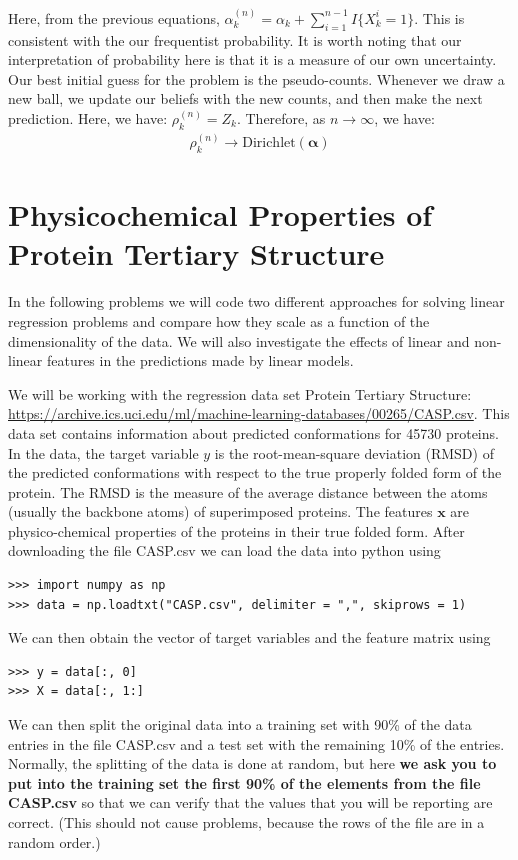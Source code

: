 \documentclass[submit]{harvardml}
\newcommand{\Dir}{\text{Dirichlet}}
\renewcommand{\v}{\boldsymbol}
\begin{document}
\begin{enumerate}[label=(\alph*)]
Here, from the previous equations, $\alpha^{(n)}_k = \alpha_k + \sum_{i=1}^{n-1} I\{X^{i}_k =1 \}$. This is consistent with the our frequentist probability. It is worth noting that our interpretation of probability here is that it is a measure of our own uncertainty. Our best initial guess for the problem is the pseudo-counts. Whenever we draw a new ball, we update our beliefs with the new counts, and then make the next prediction. Here, we have:
	$\rho^{(n)}_k = Z_k$.
	Therefore, as $n \rightarrow \infty$, we have:
	\begin{align*}
		\rho^{(n)}_k \rightarrow \Dir(\v \alpha)
	\end{align*}
\end{enumerate}
\newpage
\section*{Physicochemical Properties of Protein Tertiary Structure}

In the following problems we will code two different approaches for
solving linear regression problems and compare how they scale as a function of
the dimensionality of the data.  We will also investigate the effects of
linear and non-linear features in the predictions made by linear models.

We will be working with the regression data set Protein
Tertiary Structure:
\url{https://archive.ics.uci.edu/ml/machine-learning-databases/00265/CASP.csv}.
This data set contains information about predicted conformations for 45730
proteins. In the data, the target variable $y$ is the root-mean-square
deviation (RMSD) of the predicted conformations with respect to the true properly
folded form of the protein. The RMSD is the measure of the average distance
between the atoms (usually the backbone atoms) of superimposed proteins.
The features $\mathbf{x}$ are
physico-chemical properties of the proteins in their true folded form. After
downloading the file CASP.csv we can load the data into python using
\begin{verbatim}
>>> import numpy as np
>>> data = np.loadtxt("CASP.csv", delimiter = ",", skiprows = 1)
\end{verbatim}
We can then obtain the vector of target variables and the feature matrix using
\begin{verbatim}
>>> y = data[:, 0]
>>> X = data[:, 1:]
\end{verbatim}
We can then split the original data into a training set with 90\% of the data
entries in the file CASP.csv and a test set with the remaining 10\% of the
entries. Normally, the splitting of the data is done at random, but here {\bf we ask
you to put into the training set the first 90\% of the elements from the
file CASP.csv} so that we can verify that the values that you will be reporting are correct.
(This should not cause problems, because the rows of the file are in a random order.)
\end{document}
